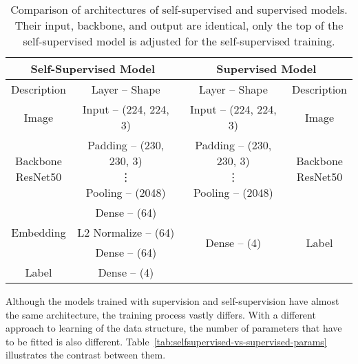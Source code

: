 \begin{table}[!ht]
    \begin{center}
        \begin{tabular}{ |c|c||c|c| }
            \hline
                \multicolumn{2}{|c||}{Self-Supervised Model} & \multicolumn{2}{c|}{Supervised Model} \\
            \hline
            \hline
            Description & Layer -- Shape & Layer -- Shape & Description \\
            \hline
            \hline
                Image & Input -- (224, 224, 3) & Input -- (224, 224, 3) & Image \\
            \hline
                \makecell{Backbone \\ ResNet50} & \makecell{Padding -- (230, 230, 3) \\ \vdots \\ Pooling -- (2048)} & \makecell{Padding -- (230, 230, 3) \\ \vdots \\ Pooling -- (2048)} & \makecell{Backbone \\ ResNet50} \\
            \hline
                & Dense -- (64) & \multirow{4}{*}{Dense -- (4)} & \multirow{4}{*}{Label} \\
            \cline{1-2}
                Embedding & L2 Normalize -- (64) & & \\
            \cline{1-2}
                & Dense -- (64) & & \\
            \cline{1-2}
                Label & Dense -- (4) & & \\
            \hline
        \end{tabular}
    \end{center}
    \caption{Comparison of architectures of self-supervised and supervised models. Their input, backbone, and output are identical, only the top of the self-supervised model is adjusted for the self-supervised training.}
    \label{tab:self-supervised-vs-supervised}
\end{table}

Although the models trained with supervision and self-supervision have almost the same architecture, the training process vastly differs. With a different approach to learning of the data structure, the number of parameters that have to be fitted is also different. Table~\ref{tab:selfsupervised-vs-supervised-params} illustrates the contrast between them.

